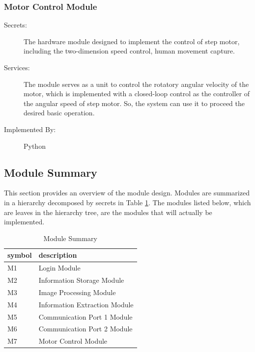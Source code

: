 \documentclass[12pt, titlepage]{article}
\begin{document}
\subsubsection{Motor Control Module}
\begin{description}
\item[Secrets:]The hardware module designed to implement the control of step motor, including the two-dimension speed control, human movement capture.
\item[Services:]The module serves as a unit to control the rotatory angular velocity of the motor, which is implemented with a closed-loop control as the controller of the angular speed of step motor. So, the system can use it to proceed the desired basic operation.
\item[Implemented By:] Python
\end{description}


\subsection{Module Summary}
This section provides an overview of the module design. Modules are summarized
in a hierarchy decomposed by secrets in Table \ref{TableMS}. The modules listed
below, which are leaves in the hierarchy tree, are the modules that will
actually be implemented.
\begin{table}[H]
\begin{tabularx}{\textwidth}{XX}
  \toprule		
  \textbf{symbol} & \textbf{description}\\
  \midrule 
  M1 & Login Module \\
  M2 & Information Storage Module \\
  M3 & Image Processing Module \\
  M4 & Information Extraction Module \\
  M5 & Communication Port 1 Module \\
  M6 & Communication Port 2 Module \\
  M7 & Motor Control Module \\
  \bottomrule
\end{tabularx}
\caption{Module Summary}
\label{TableMS}
\end{table}
\end{document}
